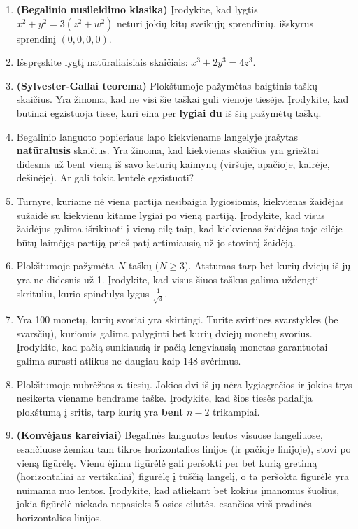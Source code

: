 \documentclass[11pt,a4paper]{scrartcl}
\begin{document}
\begin{enumerate}
    \item \textbf{(Begalinio nusileidimo klasika)} Įrodykite, kad lygtis $x^2 + y^2 = 3(z^2 + w^2)$ neturi jokių kitų sveikųjų sprendinių, išskyrus sprendinį $(0, 0, 0, 0)$.
    \item Išspręskite lygtį natūraliaisiais skaičiais: $x^3 + 2y^3 = 4z^3$.
    \item \textbf{(Sylvester-Gallai teorema)} Plokštumoje pažymėtas baigtinis taškų skaičius. Yra žinoma, kad ne visi šie taškai guli vienoje tiesėje. Įrodykite, kad būtinai egzistuoja tiesė, kuri eina per \textbf{lygiai du} iš šių pažymėtų taškų.
    \item Begalinio languoto popieriaus lapo kiekviename langelyje įrašytas \textbf{natūralusis} skaičius. Yra žinoma, kad kiekvienas skaičius yra griežtai didesnis už bent vieną iš savo keturių kaimynų (viršuje, apačioje, kairėje, dešinėje). Ar gali tokia lentelė egzistuoti?
    \item Turnyre, kuriame nė viena partija nesibaigia lygiosiomis, kiekvienas žaidėjas sužaidė su kiekvienu kitame lygiai po vieną partiją. Įrodykite, kad visus žaidėjus galima išrikiuoti į vieną eilę taip, kad kiekvienas žaidėjas toje eilėje būtų laimėjęs partiją prieš patį artimiausią už jo stovintį žaidėją.
    \item Plokštumoje pažymėta $N$ taškų ($N \ge 3$). Atstumas tarp bet kurių dviejų iš jų yra ne didesnis už 1. Įrodykite, kad visus šiuos taškus galima uždengti skrituliu, kurio spindulys lygus $\frac{1}{\sqrt{3}}$.
    \item Yra 100 monetų, kurių svoriai yra skirtingi. Turite svirtines svarstykles (be svarsčių), kuriomis galima palyginti bet kurių dviejų monetų svorius. Įrodykite, kad pačią sunkiausią ir pačią lengviausią monetas garantuotai galima surasti atlikus ne daugiau kaip 148 svėrimus.
    \item Plokštumoje nubrėžtos $n$ tiesių. Jokios dvi iš jų nėra lygiagrečios ir jokios trys nesikerta viename bendrame taške. Įrodykite, kad šios tiesės padalija plokštumą į sritis, tarp kurių yra \textbf{bent} $n-2$ trikampiai.
    \item \textbf{(Konvėjaus kareiviai)} Begalinės languotos lentos visuose langeliuose, esančiuose žemiau tam tikros horizontalios linijos (ir pačioje linijoje), stovi po vieną figūrėlę. Vienu ėjimu figūrėlė gali peršokti per bet kurią gretimą (horizontaliai ar vertikaliai) figūrėlę į tuščią langelį, o ta peršokta figūrėlė yra nuimama nuo lentos. Įrodykite, kad atliekant bet kokius įmanomus šuolius, jokia figūrėlė niekada nepasieks 5-osios eilutės, esančios virš pradinės horizontalios linijos.
\end{enumerate}
\end{document}
